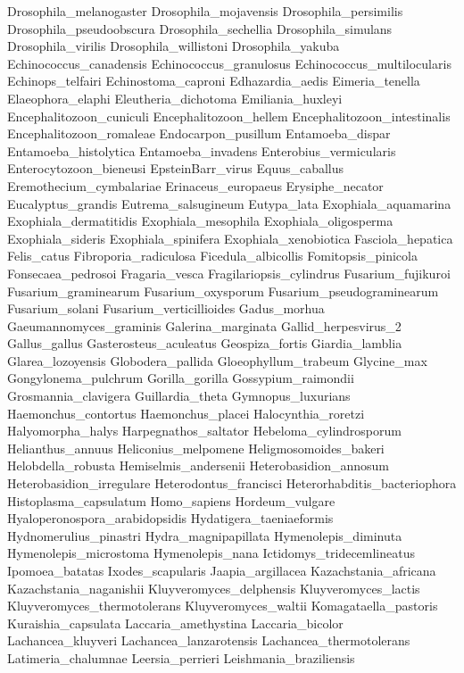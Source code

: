 \documentclass[letterpaper,10pt,english]{sphinxmanual}
\begin{document}
{\begin{sphinxVerbatim}[commandchars=\\\{\}]
Drosophila\_melanogaster
Drosophila\_mojavensis
Drosophila\_persimilis
Drosophila\_pseudoobscura
Drosophila\_sechellia
Drosophila\_simulans
Drosophila\_virilis
Drosophila\_willistoni
Drosophila\_yakuba
Echinococcus\_canadensis
Echinococcus\_granulosus
Echinococcus\_multilocularis
Echinops\_telfairi
Echinostoma\_caproni
Edhazardia\_aedis
Eimeria\_tenella
Elaeophora\_elaphi
Eleutheria\_dichotoma
Emiliania\_huxleyi
Encephalitozoon\_cuniculi
Encephalitozoon\_hellem
Encephalitozoon\_intestinalis
Encephalitozoon\_romaleae
Endocarpon\_pusillum
Entamoeba\_dispar
Entamoeba\_histolytica
Entamoeba\_invadens
Enterobius\_vermicularis
Enterocytozoon\_bieneusi
EpsteinBarr\_virus
Equus\_caballus
Eremothecium\_cymbalariae
Erinaceus\_europaeus
Erysiphe\_necator
Eucalyptus\_grandis
Eutrema\_salsugineum
Eutypa\_lata
Exophiala\_aquamarina
Exophiala\_dermatitidis
Exophiala\_mesophila
Exophiala\_oligosperma
Exophiala\_sideris
Exophiala\_spinifera
Exophiala\_xenobiotica
Fasciola\_hepatica
Felis\_catus
Fibroporia\_radiculosa
Ficedula\_albicollis
Fomitopsis\_pinicola
Fonsecaea\_pedrosoi
Fragaria\_vesca
Fragilariopsis\_cylindrus
Fusarium\_fujikuroi
Fusarium\_graminearum
Fusarium\_oxysporum
Fusarium\_pseudograminearum
Fusarium\_solani
Fusarium\_verticillioides
Gadus\_morhua
Gaeumannomyces\_graminis
Galerina\_marginata
Gallid\_herpesvirus\_2
Gallus\_gallus
Gasterosteus\_aculeatus
Geospiza\_fortis
Giardia\_lamblia
Glarea\_lozoyensis
Globodera\_pallida
Gloeophyllum\_trabeum
Glycine\_max
Gongylonema\_pulchrum
Gorilla\_gorilla
Gossypium\_raimondii
Grosmannia\_clavigera
Guillardia\_theta
Gymnopus\_luxurians
Haemonchus\_contortus
Haemonchus\_placei
Halocynthia\_roretzi
Halyomorpha\_halys
Harpegnathos\_saltator
Hebeloma\_cylindrosporum
Helianthus\_annuus
Heliconius\_melpomene
Heligmosomoides\_bakeri
Helobdella\_robusta
Hemiselmis\_andersenii
Heterobasidion\_annosum
Heterobasidion\_irregulare
Heterodontus\_francisci
Heterorhabditis\_bacteriophora
Histoplasma\_capsulatum
Homo\_sapiens
Hordeum\_vulgare
Hyaloperonospora\_arabidopsidis
Hydatigera\_taeniaeformis
Hydnomerulius\_pinastri
Hydra\_magnipapillata
Hymenolepis\_diminuta
Hymenolepis\_microstoma
Hymenolepis\_nana
Ictidomys\_tridecemlineatus
Ipomoea\_batatas
Ixodes\_scapularis
Jaapia\_argillacea
Kazachstania\_africana
Kazachstania\_naganishii
Kluyveromyces\_delphensis
Kluyveromyces\_lactis
Kluyveromyces\_thermotolerans
Kluyveromyces\_waltii
Komagataella\_pastoris
Kuraishia\_capsulata
Laccaria\_amethystina
Laccaria\_bicolor
Lachancea\_kluyveri
Lachancea\_lanzarotensis
Lachancea\_thermotolerans
Latimeria\_chalumnae
Leersia\_perrieri
Leishmania\_braziliensis

\end{sphinxVerbatim}}
\end{document}

